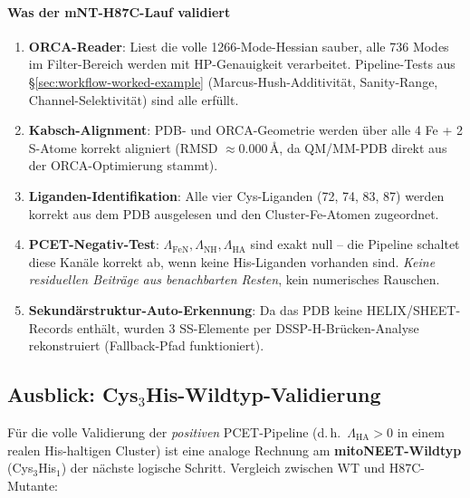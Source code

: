 \documentclass[11pt,a4paper,twoside]{article}
\providecommand{\angstrom}{\text{\AA}}    %
\theoremstyle{remark}
\begin{document}
\paragraph{Was der mNT-H87C-Lauf validiert}

\begin{enumerate}
  \item \textbf{ORCA-Reader}: Liest die volle 1266-Mode-Hessian
        sauber, alle 736 Modes im Filter-Bereich werden mit
        HP-Genauigkeit verarbeitet. Pipeline-Tests aus
        \S\ref{sec:workflow-worked-example} (Marcus-Hush-Additivit\"at,
        Sanity-Range, Channel-Selektivit\"at) sind alle erf\"ullt.
  \item \textbf{Kabsch-Alignment}: PDB- und ORCA-Geometrie werden
        \"uber alle 4 Fe + 2 S-Atome korrekt aligniert (RMSD
        $\approx 0.000$\,$\angstrom$, da QM/MM-PDB direkt aus der
        ORCA-Optimierung stammt).
  \item \textbf{Liganden-Identifikation}: Alle vier Cys-Liganden
        (72, 74, 83, 87) werden korrekt aus dem PDB ausgelesen
        und den Cluster-Fe-Atomen zugeordnet.
  \item \textbf{PCET-Negativ-Test}: $\Lambda_\text{FeN}, \Lambda_\text{NH},
        \Lambda_\text{HA}$ sind exakt null -- die Pipeline schaltet
        diese Kan\"ale korrekt ab, wenn keine His-Liganden vorhanden
        sind. \emph{Keine residuellen Beitr\"age aus benachbarten
        Resten}, kein numerisches Rauschen.
  \item \textbf{Sekund\"arstruktur-Auto-Erkennung}: Da das PDB keine
        HELIX/SHEET-Records enth\"alt, wurden 3 SS-Elemente per
        DSSP-H-Br\"ucken-Analyse rekonstruiert (Fallback-Pfad
        funktioniert).
\end{enumerate}

\subsection{Ausblick: Cys$_3$His-Wildtyp-Validierung}
\label{sec:val-cys3his-wt}

F\"ur die volle Validierung der \emph{positiven} PCET-Pipeline
(d.\,h.\ $\Lambda_\text{HA} > 0$ in einem realen His-haltigen Cluster)
ist eine analoge Rechnung am \textbf{mitoNEET-Wildtyp}
(Cys$_3$His$_1$) der n\"achste logische Schritt. Vergleich
zwischen WT und H87C-Mutante:
\end{document}
